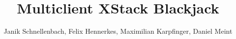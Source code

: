 \usepackage[utf8]{inputenc}
\usepackage{packages}
\usepackage{beamermods}

\author[XForms]{Janik Schnellenbach, Felix Hennerkes, Maximilian Karpfinger, Daniel Meint}
\title[XML Blackjack]{Multiclient XStack Blackjack}







\usepackage{pgfpages}
\usepackage{ifthen}
\newif\ifsolution%

\makeatletter
\let\@@magyar@captionfix\relax
\makeatother

